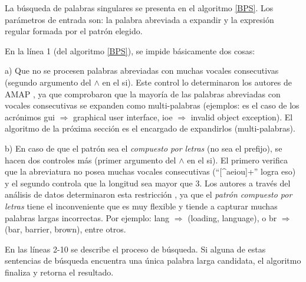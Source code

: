 La búsqueda de palabras singulares se presenta en el algoritmo \ref{BPS}. Los parámetros de entrada son: la palabra abreviada a expandir y la expresión regular formada por el patrón elegido.

En la línea 1 (del algoritmo \ref{BPS}), se impide básicamente dos cosas: 

a) Que no se procesen palabras abreviadas con muchas vocales consecutivas (segundo argumento del $\land$ en el \textsf{si}). Este control lo determinaron los autores de AMAP \cite{EZH08}, ya que comprobaron que la mayoría de las palabras abreviadas con vocales consecutivas se expanden como multi-palabras (ejemplos: es el caso de los acrónimos \textsf{gui} $\Rightarrow$ \textsf{graphical user interface}, \textsf{ioe} $\Rightarrow$ \textsf{invalid object exception}). El algoritmo de la próxima sección es el encargado de expandirlos (multi-palabras).

b) En caso de que el patrón sea el \textit{compuesto por letras} (no sea el prefijo), se hacen dos controles más (primer argumento del $\land$ en el \textsf{si}). El primero verifica que la abreviatura no posea muchas vocales consecutivas (“[\^{}aeiou]+” logra eso) y el segundo controla que la longitud sea mayor que 3. Los autores a través del análisis de datos determinaron esta restricción \cite{EZH08}, ya que el \textit{patrón compuesto por letras} tiene el inconveniente que es muy flexible y tiende a capturar muchas palabras largas incorrectas. Por ejemplo: \textsf{lang} $\Rightarrow$ (\textsf{loading}, \textsf{language}), o \textsf{br} $\Rightarrow$ (\textsf{bar}, \textsf{barrier}, \textsf{brown}), entre otros.

En las líneas 2-10 se describe el proceso de búsqueda. Si alguna de estas sentencias de búsqueda encuentra una única palabra larga candidata, el algoritmo finaliza y retorna el resultado. 

